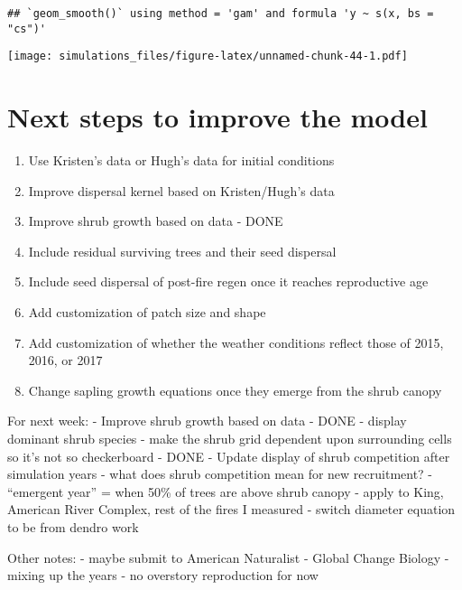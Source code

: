 \documentclass[]{article}
\providecommand{\tightlist}{%
  \setlength{\itemsep}{0pt}\setlength{\parskip}{0pt}}
\begin{document}
\begin{verbatim}
## `geom_smooth()` using method = 'gam' and formula 'y ~ s(x, bs = "cs")'
\end{verbatim}

\texttt{[image: simulations\_files/figure-latex/unnamed-chunk-44-1.pdf]}

\section{Next steps to improve the
model}\label{next-steps-to-improve-the-model}

\begin{enumerate}
\def\labelenumi{\arabic{enumi}.}
\tightlist
\item
  Use Kristen's data or Hugh's data for initial conditions
\item
  Improve dispersal kernel based on Kristen/Hugh's data
\item
  Improve shrub growth based on data - DONE
\item
  Include residual surviving trees and their seed dispersal
\item
  Include seed dispersal of post-fire regen once it reaches reproductive
  age
\item
  Add customization of patch size and shape
\item
  Add customization of whether the weather conditions reflect those of
  2015, 2016, or 2017
\item
  Change sapling growth equations once they emerge from the shrub canopy
\end{enumerate}

For next week: - Improve shrub growth based on data - DONE - display
dominant shrub species - make the shrub grid dependent upon surrounding
cells so it's not so checkerboard - DONE - Update display of shrub
competition after simulation years - what does shrub competition mean
for new recruitment? - ``emergent year'' = when 50\% of trees are above
shrub canopy - apply to King, American River Complex, rest of the fires
I measured - switch diameter equation to be from dendro work

Other notes: - maybe submit to American Naturalist - Global Change
Biology - mixing up the years - no overstory reproduction for now
\end{document}
